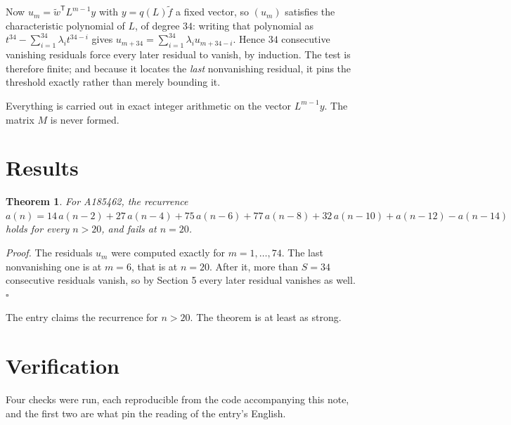 \documentclass[11pt]{article}
\newtheorem{theorem}{Theorem}
\theoremstyle{definition}
\begin{document}
Now $u_m = \tilde w^{\mathsf T} L^{m-1} y$ with $y = q(L)\tilde f$ a fixed vector, so $(u_m)$ satisfies the characteristic polynomial of $L$, of degree $34$: writing that polynomial as $t^{34} - \sum_{i=1}^{34} \lambda_i t^{34-i}$ gives $u_{m+34} = \sum_{i=1}^{34} \lambda_i u_{m+34-i}$. Hence $34$ consecutive vanishing residuals force every later residual to vanish, by induction. The test is therefore finite; and because it locates the {\itshape last} nonvanishing residual, it pins the threshold exactly rather than merely bounding it.

Everything is carried out in exact integer arithmetic on the vector $L^{m-1}y$. The matrix $M$ is never formed.

\section{Results}

\begin{theorem} For A185462, the recurrence $a(n) = 14\,a(n-2) + 27\,a(n-4) + 75\,a(n-6) + 77\,a(n-8) + 32\,a(n-10) + a(n-12) - a(n-14)$ holds for every $n > 20$, and fails at $n = 20$.\end{theorem}

{\itshape Proof.} The residuals $u_m$ were computed exactly for $m = 1,\dots,74$. The last nonvanishing one is at $m = 6$, that is at $n = 20$. After it, more than $S = 34$ consecutive residuals vanish, so by Section 5 every later residual vanishes as well. $\square$

The entry claims the recurrence for $n > 20$. The theorem is at least as strong.

\section{Verification}

Four checks were run, each reproducible from the code accompanying this note, and the first two are what pin the reading of the entry's English.
\end{document}
